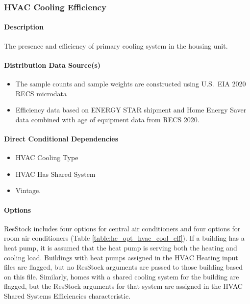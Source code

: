 \subsubsection{HVAC Cooling Efficiency}
\paragraph{Description}
The presence and efficiency of primary cooling system in the housing unit.

\paragraph{Distribution Data Source(s)}
\begin{itemize}
    \item The sample counts and sample weights are constructed using U.S.~EIA 2020 RECS microdata 
    \item Efficiency data based on ENERGY STAR shipment and Home Energy Saver data combined with age of equipment data from RECS 2020.
\end{itemize}

\paragraph{Direct Conditional Dependencies}
\begin{itemize}
    \item HVAC Cooling Type
    \item HVAC Has Shared System
    \item Vintage.
\end{itemize}

\paragraph{Options}
ResStock includes four options for central air conditioners and four options for room air conditioners (Table \ref{table:hc_opt_hvac_cool_eff}). If a building has a heat pump, it is assumed that the heat pump is serving both the heating and cooling load. Buildings with heat pumps assigned in the HVAC Heating input files are flagged, but no ResStock arguments are passed to those building based on this file. Similarly, homes with a shared cooling system for the building are flagged, but the ResStock arguments for that system are assigned in the HVAC Shared Systems Efficiencies characteristic. 


